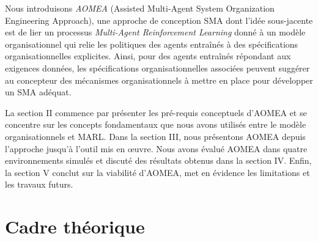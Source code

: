 \documentclass[contribution]{jfsma}
\begin{document}
Nous introduisons \emph{AOMEA} (Assisted Multi-Agent System Organization Engineering Approach), une approche de conception SMA dont l'idée sous-jacente est de lier un processus \emph{Multi-Agent Reinforcement Learning} donné à un modèle organisationnel qui relie les politiques des agents entraînés à des spécifications organisationnelles explicites. Ainsi, pour des agents entraînés répondant aux exigences données, les spécifications organisationnelles associées peuvent suggérer au concepteur des mécanismes organisationnels à mettre en place pour développer un SMA adéquat.%



La section II commence par présenter les pré-requis conceptuels d'AOMEA et se concentre sur les concepts fondamentaux que nous avons utilisés entre le modèle organisationnels et MARL.
Dans la section III, nous présentons AOMEA depuis l’approche jusqu’à l’outil mis en œuvre. Nous avons évalué AOMEA dans quatre environnements simulés et discuté des résultats obtenus dans la section IV. Enfin, la section V conclut sur la viabilité d'AOMEA, met en évidence les limitations et les travaux futurs.


\section{Cadre théorique}
\end{document}
